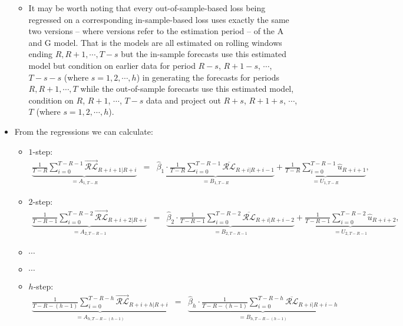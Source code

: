 \documentclass[11pt]{article}
\begin{document}
\begin{itemize}
\begin{itemize}
\item It may be worth noting that every out-of-sample-based loss being regressed on a corresponding in-sample-based loss uses exactly the same two versions -- where versions refer to the estimation period -- of the A and G model.  That is the models are all estimated on rolling windows ending $R, R+1, \cdots, T-s$ but the in-sample forecasts use this estimated model but condition on earlier data for period $R-s$, $R+1-s$, $\cdots$, $T-s-s$ (where $s=1,2,\cdots,h$) in generating the forecasts for periods $R, R+1, \cdots, T$ while the out-of-sample forecasts use this estimated model, condition on $R$, $R+1$, $\cdots$, $T-s$ data and project out  $R+s$, $R+1+s$, $\cdots$, $T$ (where $s=1,2,\cdots,h$).
\end{itemize}
\item From the regressions we can calculate:
\begin{itemize}
\item $1$-step: 
\begin{eqnarray}
\underbrace{\frac{1}{T\!-\!R}\!\!\sum_{i=0}^{T-R-1}\!\!\overrightarrow{\mathcal{RL}}_{R+i+1|R+i}}_{=A_{1,T-R}}
\!\!\!\!&=&\!\!\!\!\underbrace{\widehat{\beta}_{1}\cdot\frac{1}{T\!-\!R}\!\!\sum_{i=0}^{T-R-1}\!\!\overline{\mathcal{RL}}_{R+i|R+i-1}}_{=B_{1,T-R}} 
+\underbrace{\frac{1}{T\!-\!R}\!\!\sum_{i=0}^{T-R-1}\!\!\widehat{u}_{R+i+1}}_{=U_{1,T-R}}, \nonumber
\end{eqnarray}
\item $2$-step: 
\begin{eqnarray}
\underbrace{\frac{1}{T\!-\!R\!-\!1}\!\!\sum_{i=0}^{T-R-2}\!\!\overrightarrow{\mathcal{RL}}_{R+i+2|R+i}}_{=A_{2,T-R-1}}
\!\!\!\!&=&\!\!\!\!\underbrace{\widehat{\beta}_{2}\cdot\frac{1}{T\!-\!R\!-\!1}\!\!\sum_{i=0}^{T-R-2}\!\!\overline{\mathcal{RL}}_{R+i|R+i-2}}_{=B_{2,T-R-1}} 
+\underbrace{\frac{1}{T\!-\!R\!-\!1}\!\!\sum_{i=0}^{T-R-2}\!\!\widehat{u}_{R+i+2}}_{=U_{2,T-R-1}}, \nonumber 
\end{eqnarray}
\item $\cdots$
\item $\cdots$
\item $h$-step: 
\begin{eqnarray}
\underbrace{\frac{1}{T\!-\!R\!-\!(h\!-\!1)}\!\!\!\!\sum_{i=0}^{T-R-h}\!\!\!\!\overrightarrow{\mathcal{RL}}_{R+i+h|R+i}}_{=A_{h,T-R-(h-1)}}
\!\!\!\!&=&\!\!\!\!\underbrace{\widehat{\beta}_{h}\cdot\frac{1}{T\!-\!R\!-\!(h\!-\!1)}\!\!\!\!\sum_{i=0}^{T-R-h}\!\!\!\!\overline{\mathcal{RL}}_{R+i|R+i-h}}_{=B_{h,T-R-(h-1)}} \ \ \ \   \ \ \ \    \ \ \ \   \ \ 

\end{eqnarray}
\end{itemize}
\end{itemize}
\end{document}
